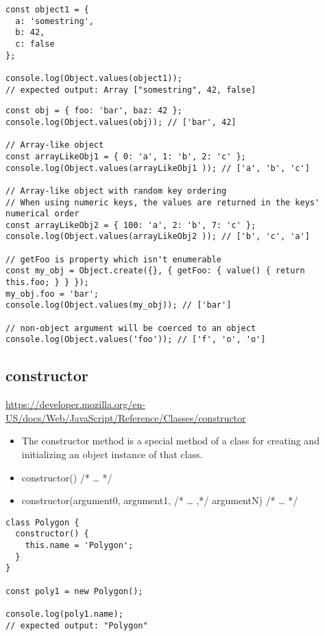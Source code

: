 \documentclass[10pt]{article}
\begin{document}
\begin{lstlisting}[title=Example Object.values(), captionpos=t]
const object1 = {
  a: 'somestring',
  b: 42,
  c: false
};

console.log(Object.values(object1));
// expected output: Array ["somestring", 42, false]
\end{lstlisting}


\begin{lstlisting}[title=Example values(), captionpos=t]
const obj = { foo: 'bar', baz: 42 };
console.log(Object.values(obj)); // ['bar', 42]

// Array-like object
const arrayLikeObj1 = { 0: 'a', 1: 'b', 2: 'c' };
console.log(Object.values(arrayLikeObj1 )); // ['a', 'b', 'c']

// Array-like object with random key ordering
// When using numeric keys, the values are returned in the keys' numerical order
const arrayLikeObj2 = { 100: 'a', 2: 'b', 7: 'c' };
console.log(Object.values(arrayLikeObj2 )); // ['b', 'c', 'a']

// getFoo is property which isn't enumerable
const my_obj = Object.create({}, { getFoo: { value() { return this.foo; } } });
my_obj.foo = 'bar';
console.log(Object.values(my_obj)); // ['bar']

// non-object argument will be coerced to an object
console.log(Object.values('foo')); // ['f', 'o', 'o']
\end{lstlisting}
\medskip %






\medskip %
\pagebreak
\subsection{constructor}

\url{https://developer.mozilla.org/en-US/docs/Web/JavaScript/Reference/Classes/constructor}


\begin{itemize}
	\item The constructor method is a special method of a class for creating and initializing an object instance of that class.
	\item constructor() { /* … */ }
	\item constructor(argument0, argument1, /* … ,*/ argumentN) { /* … */ }

\end{itemize}

\begin{lstlisting}[title=Example Classes Constructor, captionpos=t]
class Polygon {
  constructor() {
    this.name = 'Polygon';
  }
}

const poly1 = new Polygon();

console.log(poly1.name);
// expected output: "Polygon"
\end{lstlisting}
\medskip %
\end{document}
